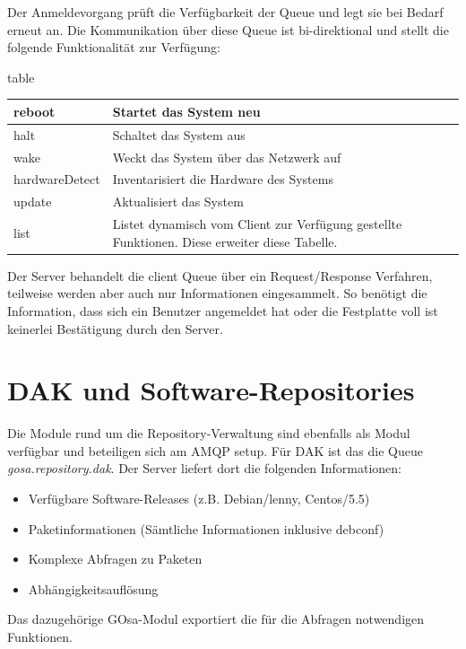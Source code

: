Der Anmeldevorgang prüft die Verfügbarkeit der Queue und legt sie bei Bedarf erneut
an. Die Kommunikation über diese Queue ist bi-direktional und stellt die folgende
Funktionalität zur Verfügung:

\begin{nofloat}{table}
 \begin{center}
  \begin{tabularx}{\textwidth}[]{|X|X|}
   \hline
   reboot         & Startet das System neu\\
   \hline
   halt           & Schaltet das System aus\\
   \hline
   wake           & Weckt das System über das Netzwerk auf\\
   \hline
   hardwareDetect & Inventarisiert die Hardware des Systems\\
   \hline
   update         & Aktualisiert das System\\
   \hline
   list           & Listet dynamisch vom Client zur Verfügung gestellte Funktionen. Diese erweiter diese Tabelle.\\
   \hline
  \end{tabularx}
 \end{center}
\end{nofloat}

Der Server behandelt die client Queue über ein Request/Response Verfahren,
teilweise werden aber auch nur Informationen eingesammelt. So benötigt die
Information, dass sich ein Benutzer angemeldet hat oder die Festplatte
voll ist keinerlei Bestätigung durch den Server.


\section{DAK und Software-Repositories}

Die Module rund um die Repository-Verwaltung sind ebenfalls als Modul verfügbar
und beteiligen sich am AMQP setup. Für DAK ist das die Queue \textit{gosa.repository.dak}.
Der Server liefert dort die folgenden Informationen:

\begin{itemize}
 \item Verfügbare Software-Releases (z.B. Debian/lenny, Centos/5.5)
 \item Paketinformationen (Sämtliche Informationen inklusive debconf)
 \item Komplexe Abfragen zu Paketen
 \item Abhängigkeitsauflösung
\end{itemize}

Das dazugehörige GOsa-Modul exportiert die für die Abfragen notwendigen Funktionen.

